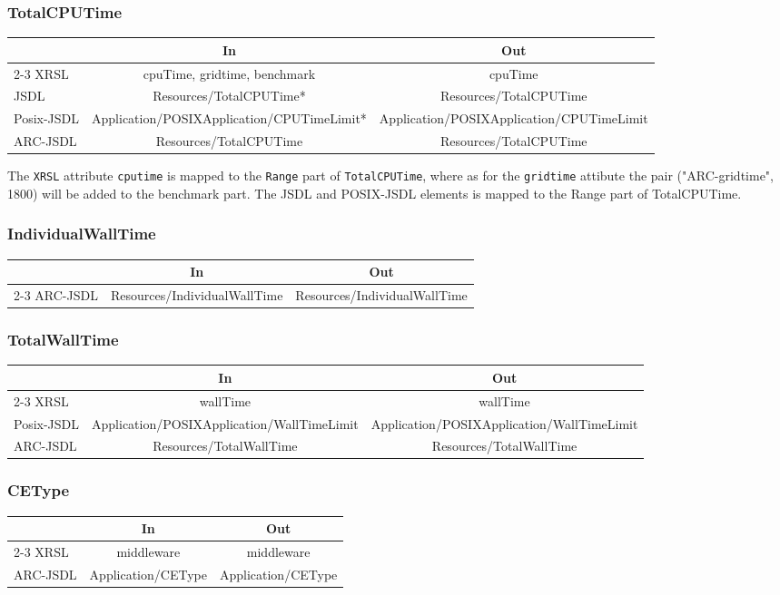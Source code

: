 \documentclass{article}
\newenvironment{inouttabular}%
{\begin{center}\begin{tabular}{l>{\ttfamily\footnotesize}c>{\ttfamily\footnotesize}c}%
\toprule
& \textnormal{\normalsize{In}} & \textnormal{\normalsize{Out}}\\ \cmidrule{2-3}}
{\bottomrule\end{tabular}\end{center}}
\begin{document}
\subsubsection{TotalCPUTime}
\begin{inouttabular}
XRSL & cpuTime, gridtime, benchmark & cpuTime\\
JSDL & Resources/TotalCPUTime* & Resources/TotalCPUTime\\
Posix-JSDL & Application/POSIXApplication/CPUTimeLimit* & Application/POSIXApplication/CPUTimeLimit\\
ARC-JSDL & Resources/TotalCPUTime & Resources/TotalCPUTime\\
\end{inouttabular}
The \texttt{XRSL} attribute \texttt{cputime} is mapped to the
\texttt{Range} part of \texttt{TotalCPUTime}, where as for the
\texttt{gridtime} attibute the pair ("ARC-gridtime", 1800) will
be added to the benchmark part.
The JSDL and POSIX-JSDL elements is mapped to the Range part of
TotalCPUTime.

\subsubsection{IndividualWallTime}
\begin{inouttabular}
ARC-JSDL & Resources/IndividualWallTime & Resources/IndividualWallTime\\
\end{inouttabular}

\subsubsection{TotalWallTime}
\begin{inouttabular}
XRSL & wallTime & wallTime\\
Posix-JSDL & Application/POSIXApplication/WallTimeLimit & Application/POSIXApplication/WallTimeLimit\\
ARC-JSDL & Resources/TotalWallTime & Resources/TotalWallTime\\
\end{inouttabular}

\subsubsection{CEType}
\begin{inouttabular}
XRSL & middleware & middleware\\
ARC-JSDL & Application/CEType & Application/CEType\\
\end{inouttabular}
\end{document}
